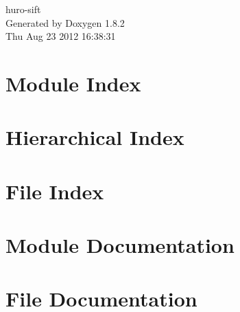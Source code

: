 \documentclass{book}
\begin{document}
\hypersetup{pageanchor=false,citecolor=blue}
\begin{titlepage}
\vspace*{7cm}
\begin{center}
{\Large huro-\/sift }\\
\vspace*{1cm}
{\large Generated by Doxygen 1.8.2}\\
\vspace*{0.5cm}
{\small Thu Aug 23 2012 16:38:31}\\
\end{center}
\end{titlepage}
\clearemptydoublepage
{}
\tableofcontents
\clearemptydoublepage
{}
\hypersetup{pageanchor=true,citecolor=blue}
\chapter{Module Index}

\chapter{Hierarchical Index}

\chapter{File Index}

\chapter{Module Documentation}



\chapter{File Documentation}





























\printindex
\end{document}
